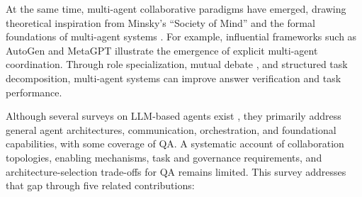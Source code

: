 \documentclass[a4paper,fleqn]{cas-dc}
\begin{document}
At the same time, multi-agent collaborative paradigms have
emerged, drawing theoretical inspiration from Minsky's ``Society of
Mind'' \citep{minsky1988society} and the formal foundations of multi-agent
systems \citep{wooldridge1995intelligent}.
For example,
influential frameworks such as AutoGen \citep{wu2024autogen} and MetaGPT
\citep{hong2024metagpt} illustrate the emergence of explicit multi-agent
coordination.
Through role specialization, mutual debate \citep{du2024multiagent_debate},
and structured task decomposition, multi-agent systems can improve answer
verification and task performance.

Although several surveys on LLM-based agents exist
\citep{guo2024llm_multiagent_survey,tran2025multiagent_survey,wang2024survey_autonomous_agents},
they primarily address general agent architectures, communication, orchestration,
and foundational capabilities, with some coverage of QA. A systematic account
of collaboration topologies, enabling mechanisms, task and governance
requirements, and architecture-selection trade-offs for QA remains limited.
This survey addresses that gap through five related contributions:
\end{document}
